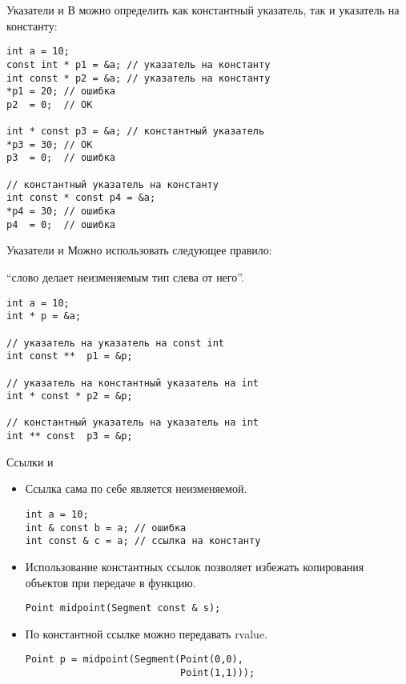 \documentclass{beamer}
\begin{document}
\begin{frame}[fragile]{Указатели и }{}
В \langcpp можно определить как константный указатель,
так и указатель на константу:
\begin{lstlisting}
int a = 10;
const int * p1 = &a; // указатель на константу
int const * p2 = &a; // указатель на константу
*p1 = 20; // ошибка
p2  = 0;  // ОК

int * const p3 = &a; // константный указатель
*p3 = 30; // OK
p3  = 0;  // ошибка

// константный указатель на константу
int const * const p4 = &a;
*p4 = 30; // ошибка
p4  = 0;  // ошибка
\end{lstlisting}
\end{frame}

\begin{frame}[fragile]{Указатели и }{}
    Можно использовать следующее правило:\\
    \begin{center}
    ``слово  делает неизменяемым тип слева от него''.
    \end{center}

\begin{lstlisting}
int a = 10;
int * p = &a;   

// указатель на указатель на const int
int const **  p1 = &p;

// указатель на константный указатель на int
int * const * p2 = &p;

// константный указатель на указатель на int
int ** const  p3 = &p;
\end{lstlisting}
\end{frame}

\begin{frame}[fragile]{Ссылки и }{}
    \begin{itemize}
        \item Ссылка сама по себе является неизменяемой.
\begin{lstlisting}
int a = 10;
int & const b = a; // ошибка
int const & c = a; // ссылка на константу
\end{lstlisting}
        \item Использование константных ссылок позволяет избежать
            копирования объектов при передаче в функцию.
\begin{lstlisting}
Point midpoint(Segment const & s);
\end{lstlisting}
        \item По константной ссылке можно передавать rvalue.
\begin{lstlisting}
Point p = midpoint(Segment(Point(0,0),
                           Point(1,1)));
\end{lstlisting}
    \end{itemize}
\end{frame}
\end{document}
